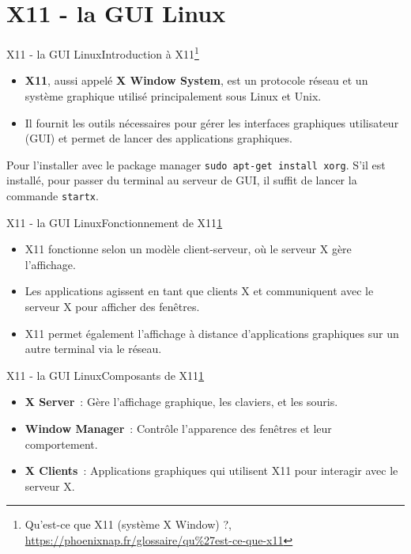 \documentclass{beamer}
\begin{document}
    \section{X11 - la GUI Linux}\label{sec:x11}

    \begin{frame}{X11 - la GUI Linux}{Introduction à X11\footnote{\label{x11}Qu'est-ce que X11 (système X Window) ?, \url{https://phoenixnap.fr/glossaire/qu\%27est-ce-que-x11}}}
        \begin{itemize}
            \item \textbf{X11}, aussi appelé \textbf{X Window System}, est un protocole réseau et un système graphique utilisé principalement sous Linux et Unix.
            \item Il fournit les outils nécessaires pour gérer les interfaces graphiques utilisateur (GUI) et permet de lancer des applications graphiques.
        \end{itemize}
        Pour l'installer avec le package manager \lstinline{sudo apt-get install xorg}.
        \bigbreak
        S'il est installé, pour passer du terminal au serveur de GUI, il suffit de lancer la commande \lstinline{startx}.
    \end{frame}

    \begin{frame}{X11 - la GUI Linux}{Fonctionnement de X11\cref{x11}}
        \begin{itemize}
            \item X11 fonctionne selon un modèle client-serveur, où le serveur X gère l'affichage.
            \item Les applications agissent en tant que clients X et communiquent avec le serveur X pour afficher des fenêtres.
            \item X11 permet également l'affichage à distance d'applications graphiques sur un autre terminal via le réseau.
        \end{itemize}
    \end{frame}

    \begin{frame}{X11 - la GUI Linux}{Composants de X11\cref{x11}}
        \begin{itemize}
            \item \textbf{X Server}~: Gère l'affichage graphique, les claviers, et les souris.
            \item \textbf{Window Manager}~: Contrôle l'apparence des fenêtres et leur comportement.
            \item \textbf{X Clients}~: Applications graphiques qui utilisent X11 pour interagir avec le serveur X.
        \end{itemize}
    \end{frame}
\end{document}
